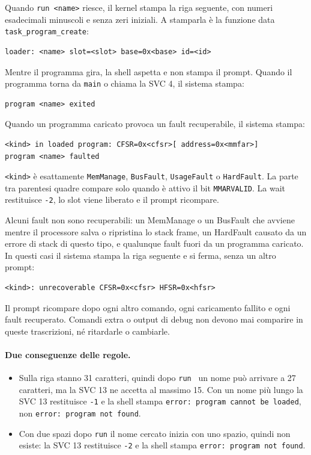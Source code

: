 Quando \texttt{run <name>} riesce, il kernel stampa la riga seguente, con numeri esadecimali minuscoli e senza zeri iniziali. A stamparla è la funzione data \texttt{task\_program\_create}:
\begin{lstlisting}
loader: <name> slot=<slot> base=0x<base> id=<id>
\end{lstlisting}

Mentre il programma gira, la shell aspetta e non stampa il prompt. Quando il programma torna da \texttt{main} o chiama la SVC 4, il sistema stampa:
\begin{lstlisting}
program <name> exited
\end{lstlisting}

Quando un programma caricato provoca un fault recuperabile, il sistema stampa:
\begin{lstlisting}
<kind> in loaded program: CFSR=0x<cfsr>[ address=0x<mmfar>]
program <name> faulted
\end{lstlisting}
\texttt{<kind>} è esattamente \texttt{MemManage}, \texttt{BusFault}, \texttt{UsageFault} o \texttt{HardFault}. La parte tra parentesi quadre compare solo quando è attivo il bit \texttt{MMARVALID}. La wait restituisce \texttt{-2}, lo slot viene liberato e il prompt ricompare.

Alcuni fault non sono recuperabili: un MemManage o un BusFault che avviene mentre il processore salva o ripristina lo stack frame, un HardFault causato da un errore di stack di questo tipo, e qualunque fault fuori da un programma caricato. In questi casi il sistema stampa la riga seguente e si ferma, senza un altro prompt:
\begin{lstlisting}
<kind>: unrecoverable CFSR=0x<cfsr> HFSR=0x<hfsr>
\end{lstlisting}

Il prompt ricompare dopo ogni altro comando, ogni caricamento fallito e ogni fault recuperato. Comandi extra o output di debug non devono mai comparire in queste trascrizioni, né ritardarle o cambiarle.

\paragraph{Due conseguenze delle regole.}
\begin{itemize}
\item Sulla riga stanno 31 caratteri, quindi dopo \texttt{run } un nome può arrivare a 27 caratteri, ma la SVC 13 ne accetta al massimo 15. Con un nome più lungo la SVC 13 restituisce \texttt{-1} e la shell stampa \texttt{error:\ program cannot be loaded}, non \texttt{error:\ program not found}.
\item Con due spazi dopo \texttt{run} il nome cercato inizia con uno spazio, quindi non esiste: la SVC 13 restituisce \texttt{-2} e la shell stampa \texttt{error:\ program not found}.
\end{itemize}

